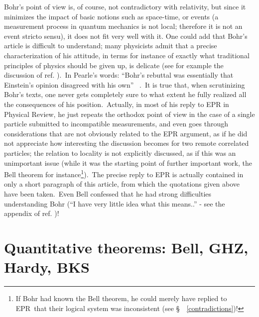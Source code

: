 \documentclass[12pt,onecolumn]{article}%
\begin{document}
Bohr's point of view is, of course, not contradictory with relativity, but
since it minimizes the impact of basic notions such as space-time, or events
(a measurement process in quantum mechanics is not local; therefore it is not
an event stricto sensu), it does not fit very well with it. One could add that
Bohr's article is difficult to understand; many physicists admit that a
precise characterization of his attitude, in terms for instance of exactly
what traditional principles of physics should be given up, is delicate (see
for example the discussion of ref. \cite{Shimony}).\ In Pearle's words:
``Bohr's rebuttal was essentially that Einstein's opinion disagreed with his
own'' \ \cite{Pearle-3}.\ It is true that, when scrutinizing Bohr's texts, one
never gets completely sure to what extent he fully realized all the
consequences of his position.\ Actually, in most of his reply to EPR
\cite{Bohr-EPR} in Physical Review, he just repeats the orthodox point of view
in the case of a single particle submitted to incompatible measurements, and
even goes through considerations that are not obviously related to the EPR
argument, as if he did not appreciate how interesting the discussion becomes
for two remote correlated particles; the relation to locality is not
explicitly discussed, as if this was an unimportant issue (while it was the
starting point of further important work, the Bell theorem for
instance\footnote{If Bohr had known the Bell theorem, he could merely have
replied to EPR\ that their logical system was inconsistent (see
\S \ \ \ref{contradictions})!}).\ The precise reply to EPR is actually
contained in only a short paragraph of this article, from which the quotations
given above have been taken.\ Even Bell confessed that he had strong
difficulties understanding Bohr (``I have very little idea what this means..''
- see the appendix of ref. \cite{Bertlmann})!

\section{Quantitative theorems: Bell, GHZ, Hardy, BKS}

\label{quantit}
\end{document}
